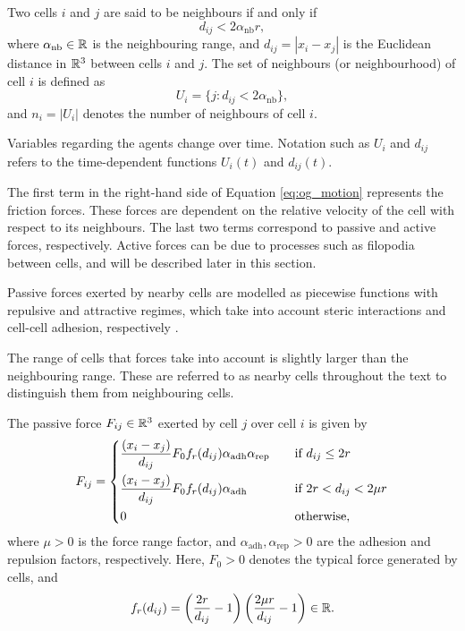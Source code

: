 \begin{definition}
    Two cells $i$ and $j$ are said to be neighbours if and only if 
    $$d_{ij}<2\alpha_\text{nb} r,$$ 
    where $\alpha_\text{nb}\in\mathbb{R}$ is the neighbouring range, and $d_{ij} = |x_i-x_j|$ is the Euclidean distance in $\mathbb{R}^{3}$ between cells $i$ and $j$. The set of neighbours (or neighbourhood) of cell $i$ is defined as
    $$U_i=\{j:d_{ij}<2\alpha_\text{nb}\},$$
    and $n_i=|U_i|$ denotes the number of neighbours of cell $i$.
\end{definition}

\begin{notation}
    Variables regarding the agents change over time. Notation such as $U_i$ and $d_{ij}$ refers to the time-dependent functions $U_i(t)$ and $d_{ij}(t)$.
\end{notation}

The first term in the right-hand side of Equation \ref{eq:og_motion} represents the friction forces. These forces are dependent on the relative velocity of the cell with res\-pect to its neighbours. The last two terms correspond to passive and active forces, respectively. Active forces can be due to processes such as filopodia bet\-ween cells, and will be described later in this section.

Passive forces exerted by nearby cells are modelled as piecewise functions with repulsive and attractive regimes, which take into account steric interactions and cell-cell adhesion, respectively \parencite{Saiz_2020,Torregrosa_2023}.

\begin{notation}
    The range of cells that forces take into account is slightly larger than the neighbouring range. These are referred to as {nearby cells} throughout the text to distinguish them from neighbouring cells.
\end{notation}

\begin{definition}
    The passive force $F_{ij}\in\mathbb{R}^3$ exerted by cell $j$ over cell $i$ is given by
    \begin{equation}\label{eq:fij}
        F_{ij}=
        \begin{dcases}
            \frac{(x_i-x_j)}{d_{ij}} 
            F_0 f_r(d_{ij})\alpha_\text{adh}\alpha_\text{rep}
            &\quad \text{if $d_{ij}\leq 2 r$} \\
            \frac{(x_i-x_j)}{d_{ij}}
            F_0 f_r(d_{ij}) \alpha_\text{adh}
            &\quad \text{if $2r<d_{ij}<2\mu r$} \\
            0 &\quad \text{otherwise,}
        \end{dcases}
    \end{equation}
    where $\mu>0$ is the force range factor, and  $\alpha_\text{adh}, \alpha_\text{rep}>0$ are the adhesion and repulsion factors, respectively. Here, $F_0>0$ denotes the typical force generated by cells, and
    \begin{equation}
        f_r (d_{ij})=
        \left(\frac{2r}{d_{ij}}-1\right)
        \left(\frac{2\mu r}{d_{ij}}-1\right)
        \in\mathbb{R}.
    \end{equation}
\end{definition}

